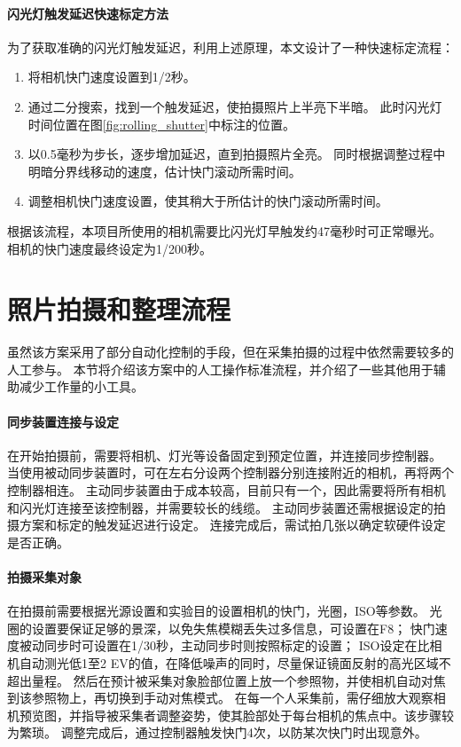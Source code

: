 \paragraph{闪光灯触发延迟快速标定方法}
为了获取准确的闪光灯触发延迟，利用上述原理，本文设计了一种快速标定流程：
\begin{enumerate}
\item 将相机快门速度设置到1/2秒。
\item 通过二分搜索，找到一个触发延迟，使拍摄照片上半亮下半暗。
此时闪光灯时间位置在图\ref{fig:rolling_shutter}中标注的位置。
\item 以0.5毫秒为步长，逐步增加延迟，直到拍摄照片全亮。
同时根据调整过程中明暗分界线移动的速度，估计快门滚动所需时间。
\item 调整相机快门速度设置，使其稍大于所估计的快门滚动所需时间。
\end{enumerate}
根据该流程，本项目所使用的相机需要比闪光灯早触发约47毫秒时可正常曝光。
相机的快门速度最终设定为1/200秒。

\section{照片拍摄和整理流程}

虽然该方案采用了部分自动化控制的手段，但在采集拍摄的过程中依然需要较多的人工参与。
本节将介绍该方案中的人工操作标准流程，并介绍了一些其他用于辅助减少工作量的小工具。

\paragraph{同步装置连接与设定}
在开始拍摄前，需要将相机、灯光等设备固定到预定位置，并连接同步控制器。
当使用被动同步装置时，可在左右分设两个控制器分别连接附近的相机，再将两个控制器相连。
主动同步装置由于成本较高，目前只有一个，因此需要将所有相机和闪光灯连接至该控制器，并需要较长的线缆。
主动同步装置还需根据设定的拍摄方案和标定的触发延迟进行设定。
连接完成后，需试拍几张以确定软硬件设定是否正确。

\paragraph{拍摄采集对象}
在拍摄前需要根据光源设置和实验目的设置相机的快门，光圈，ISO等参数。
光圈的设置要保证足够的景深，以免失焦模糊丢失过多信息，可设置在F8；
快门速度被动同步时可设置在1/30秒，主动同步时则按照标定的设置；
ISO设定在比相机自动测光低1至2 EV的值，在降低噪声的同时，尽量保证镜面反射的高光区域不超出量程。
然后在预计被采集对象脸部位置上放一个参照物，并使相机自动对焦到该参照物上，再切换到手动对焦模式。
在每一个人采集前，需仔细放大观察相机预览图，并指导被采集者调整姿势，使其脸部处于每台相机的焦点中。该步骤较为繁琐。
调整完成后，通过控制器触发快门4次，以防某次快门时出现意外。

